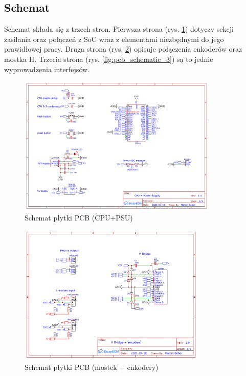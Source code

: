             \subsection{Schemat}
                Schemat składa się z trzech stron. Pierwsza strona (rys. \ref{fig:pcb_schematic_1}) dotyczy sekcji zasilania oraz połączeń z SoC wraz z elementami niezbędnymi do jego prawidłowej pracy. Druga strona (rys. \ref{fig:pcb_schematic_2}) opisuje połączenia enkoderów oraz mostka H. Trzecia strona (rys. \ref{fig:pcb_schematic_3}) są to jednie wyprowadzenia interfejsów.
                  
                \begin{landscape}
                    \begin{figure}
                      \centering
                      \includegraphics[width=0.85\textwidth]{img/pcb1.png}
                      \caption{Schemat płytki PCB (CPU+PSU)}
                      \label{fig:pcb_schematic_1}
                    \end{figure}
                \end{landscape}
                
                \begin{landscape}
                    \begin{figure}
                      \centering
                      \includegraphics[width=0.80\textwidth]{img/pcb2.png}
                      \caption{Schemat płytki PCB (mostek + enkodery)}
                      \label{fig:pcb_schematic_2}
                    \end{figure}
                \end{landscape}
        
